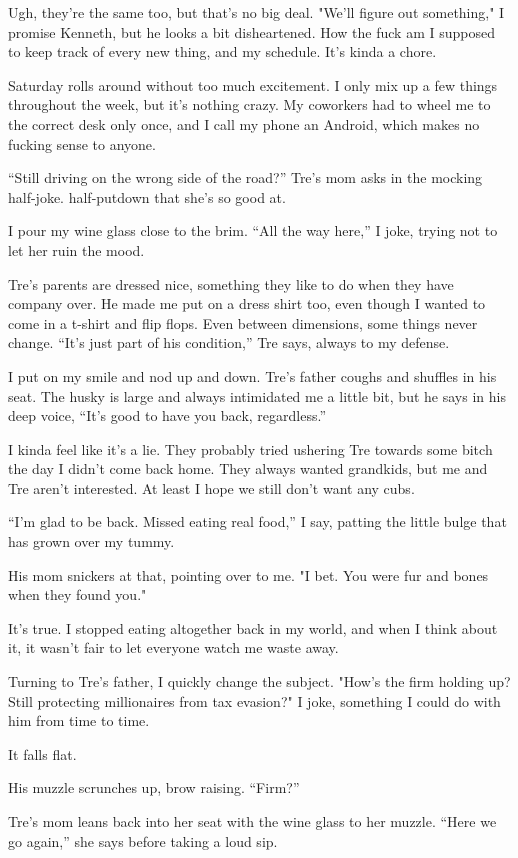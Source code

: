 Ugh, they're the same too, but that's no big deal. "We'll figure out
something," I promise Kenneth, but he looks a bit disheartened. How the
fuck am I supposed to keep track of every new thing, and my schedule.
It's kinda a chore.

Saturday rolls around without too much excitement. I only mix up a few
things throughout the week, but it's nothing crazy. My coworkers had to
wheel me to the correct desk only once, and I call my phone an Android,
which makes no fucking sense to anyone.

``Still driving on the wrong side of the road?'' Tre's mom asks in the
mocking half-joke. half-putdown that she's so good at.

I pour my wine glass close to the brim. ``All the way here,'' I joke,
trying not to let her ruin the mood.

Tre's parents are dressed nice, something they like to do when they have
company over. He made me put on a dress shirt too, even though I wanted
to come in a t-shirt and flip flops. Even between dimensions, some
things never change. ``It's just part of his condition,'' Tre says, always
to my defense.

I put on my smile and nod up and down. Tre's father coughs and shuffles
in his seat. The husky is large and always intimidated me a little bit,
but he says in his deep voice, ``It's good to have you back, regardless.''

I kinda feel like it's a lie. They probably tried ushering Tre towards
some bitch the day I didn't come back home. They always wanted
grandkids, but me and Tre aren't interested. At least I hope we still
don't want any cubs.

``I'm glad to be back. Missed eating real food,'' I say, patting the
little bulge that has grown over my tummy.

His mom snickers at that, pointing over to me. "I bet. You were fur and
bones when they found you."

It's true. I stopped eating altogether back in my world, and when I
think about it, it wasn't fair to let everyone watch me waste away.

Turning to Tre's father, I quickly change the subject. "How's the firm
holding up? Still protecting millionaires from tax evasion?" I joke,
something I could do with him from time to time.

It falls flat.

His muzzle scrunches up, brow raising. ``Firm?''

Tre's mom leans back into her seat with the wine glass to her muzzle.
``Here we go again,'' she says before taking a loud sip.


